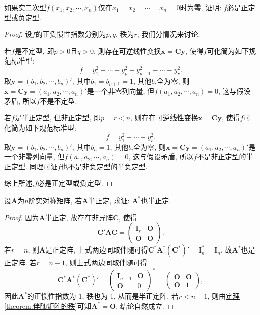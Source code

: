 \documentclass[../../main.tex]{subfiles}%
\begin{document}
\begin{proposition}\label{proposition:实二次型只在原点处为零必是正定或负定型}
如果实二次型$f(x_1, x_2, \cdots, x_n)$仅在$x_1 = x_2 = \cdots = x_n = 0$时为零, 证明: $f$必是正定型或负定型.
\end{proposition}
\begin{proof}

设$f$的正负惯性指数分别为$p,q$, 秩为$r$, 我们分情况来讨论.

若$f$是不定型, 即$p > 0$且$q > 0$, 则存在可逆线性变换$\boldsymbol{x}=\boldsymbol{C}\boldsymbol{y}$, 使得$f$可化简为如下规范标准型:
\[
f = y_1^2 + \cdots + y_p^2 - y_{p + 1}^2 - \cdots - y_r^2.
\]
取$\boldsymbol{y}=(b_1, b_2, \cdots, b_n)'$, 其中$b_1 = b_{p + 1} = 1$, 其他$b_i$全为零, 则$\boldsymbol{x}=\boldsymbol{C}\boldsymbol{y}=(a_1, a_2, \cdots, a_n)'$是一个非零列向量, 但$f(a_1, a_2, \cdots, a_n) = 0$, 这与假设矛盾, 所以$f$不是不定型.

若$f$是半正定型, 但非正定型, 即$p = r < n$, 则存在可逆线性变换$\boldsymbol{x}=\boldsymbol{C}\boldsymbol{y}$, 使得$f$可化简为如下规范标准型:
\[
f = y_1^2 + \cdots + y_r^2.
\]
取$\boldsymbol{y}=(b_1, b_2, \cdots, b_n)'$, 其中$b_n = 1$, 其他$b_i$全为零, 则$\boldsymbol{x}=\boldsymbol{C}\boldsymbol{y}=(a_1, a_2, \cdots, a_n)'$是一个非零列向量, 但$f(a_1, a_2, \cdots, a_n) = 0$, 这与假设矛盾, 所以$f$不是非正定型的半正定型. 同理可证$f$也不是非负定型的半负定型.

综上所述,$f$必是正定型或负定型. 

\end{proof}

\begin{proposition}\label{proposition:半正定阵的伴随也半正定}
设$\boldsymbol{A}$为$n$阶实对称矩阵, 若$\boldsymbol{A}$半正定, 求证: $\boldsymbol{A}^*$也半正定.
\end{proposition}
\begin{proof}

因为$\boldsymbol{A}$半正定, 故存在非异阵$\boldsymbol{C}$, 使得
\[
\boldsymbol{C}'\boldsymbol{A}\boldsymbol{C}=\begin{pmatrix}
\boldsymbol{I}_r & \boldsymbol{O} \\
\boldsymbol{O} & \boldsymbol{O}
\end{pmatrix}.
\]
若$r = n$, 则$\boldsymbol{A}$是正定阵, 上式两边同取伴随可得$\boldsymbol{C}^*\boldsymbol{A}^*(\boldsymbol{C}^*)'=\boldsymbol{I}_n^* = \boldsymbol{I}_n$, 故$\boldsymbol{A}^*$也是正定阵. 若$r = n - 1$, 则上式两边同取伴随可得
\[
\boldsymbol{C}^*\boldsymbol{A}^*(\boldsymbol{C}^*)'=\begin{pmatrix}
\boldsymbol{I}_{n - 1} & \boldsymbol{O} \\
\boldsymbol{O} & 0
\end{pmatrix}^*=\begin{pmatrix}
\boldsymbol{O} & \boldsymbol{O} \\
\boldsymbol{O} & 1
\end{pmatrix},
\]
因此$\boldsymbol{A}^*$的正惯性指数为 1, 秩也为 1, 从而是半正定阵. 若$r < n - 1$, 则由\hyperref[theorem:伴随矩阵的秩]{定理\ref{theorem:伴随矩阵的秩}}可知$\boldsymbol{A}^*=\boldsymbol{O}$, 结论自然成立.

\end{proof}
\end{document}
